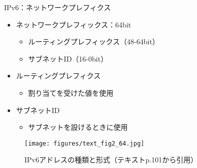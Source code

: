 \documentclass[12pt,aspectratio=169]{beamer}
\begin{document}
\begin{frame}{IPv6：ネットワークプレフィクス}

  \begin{minipage}{0.48\textwidth}
    \small
    \begin{itemize}
      \item ネットワークプレフィックス：64bit
      \begin{itemize}
        \item ルーティングプレフィックス（48-64bit）
        \item サブネットID（16-0bit）
      \end{itemize}
      \item ルーティングプレフィクス
      \begin{itemize}
        \item 割り当てを受けた値を使用
      \end{itemize}
      \item サブネットID
      \begin{itemize}
        \item サブネットを設けるときに使用
      \end{itemize}
    \end{itemize}

  \end{minipage}
  \hfill
  \begin{minipage}{0.48\textwidth}
    \vspace{-1\baselineskip}
    \centering
    \begin{figure}
      \centering
      \texttt{[image: figures/text\_fig2\_64.jpg]}
      \label{fig:text_fig2_64}
      \caption{IPv6アドレスの種類と形式（テキストp.101から引用）}
    \end{figure}
  \end{minipage}

\end{frame}
\end{document}
